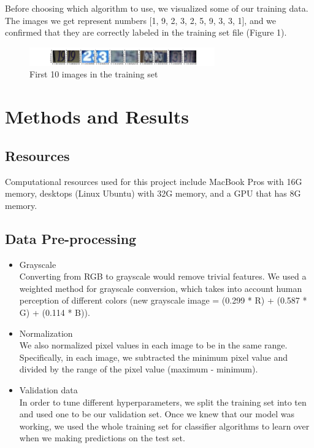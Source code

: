 \documentclass[12pt]{article}
\begin{document}
\indent Before choosing which algorithm to use, we visualized some of our training data. The images we get represent numbers [1, 9, 2, 3, 2, 5, 9, 3, 3, 1], and we confirmed that they are correctly labeled in the training set file (Figure 1). 

\begin{figure}[!tpb]
	\centerline{\includegraphics[width=80mm]{train_first10.png}}
	\caption{\label{Figure 1}
		First 10 images in the training set}
\end{figure}

\hrulefill

\section{Methods and Results}
\subsection{Resources}
Computational resources used for this project include MacBook Pros with 16G memory, desktops (Linux Ubuntu) with 32G memory, and a GPU that has 8G memory. 
\subsection{Data Pre-processing}

\begin{itemize}
	\item Grayscale\\
	Converting from RGB to grayscale would remove trivial features. We used a weighted method for grayscale conversion, which takes into account human perception of different colors (new grayscale image = (0.299 * R) + (0.587 * G) + (0.114 * B)).
	\item Normalization\\
	We also normalized pixel values in each image to be in the same range. Specifically, in each image, we subtracted the minimum pixel value and divided by the range of the pixel value (maximum - minimum).
	\item Validation data\\
	In order to tune different hyperparameters, we split the training set into ten and used one to be our validation set. Once we knew that our model was working, we used the whole training set for classifier algorithms to learn over when we making predictions on the test set.
	
\end{itemize}
\end{document}

